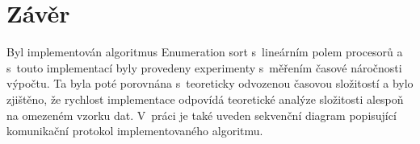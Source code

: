 \documentclass[a4paper, 12pt]{article}
\begin{document}
\section{Závěr}
Byl implementován algoritmus Enumeration sort s~lineárním polem procesorů a s~touto implementací byly provedeny
experimenty s~měřením časové náročnosti výpočtu.
Ta byla poté porovnána s~teoreticky odvozenou časovou složitostí a
bylo zjištěno, že rychlost implementace odpovídá teoretické analýze složitosti alespoň na omezeném vzorku dat.
V~práci je také uveden sekvenční diagram popisující komunikační protokol implementovaného algoritmu.
\end{document}

